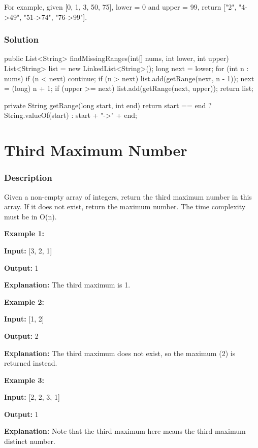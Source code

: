 For example, given [0, 1, 3, 50, 75], lower = 0 and upper = 99, return ["2", "4->49", "51->74", "76->99"].
\subsubsection{Solution}

\begin{Code}
public List<String> findMissingRanges(int[] nums, int lower, int upper) {
    List<String> list = new LinkedList<String>();
    long next = lower;
    for (int n : nums) {
        if (n < next) {
            continue;
        }
        if (n > next) {
            list.add(getRange(next, n - 1));
        }
        next = (long) n + 1;
    }
    if (upper >= next) {
        list.add(getRange(next, upper));
    }
    return list;
}

private String getRange(long start, int end) {
    return start == end ? String.valueOf(start) : start + "->" + end;
}
\end{Code}

\newpage

\section{Third Maximum Number} %

\subsubsection{Description}
Given a non-empty array of integers, return the third maximum number in this array. If it does not exist, return the maximum number. The time complexity must be in O(n).

\textbf{Example 1:}

\textbf{Input:} [3, 2, 1]

\textbf{Output:} 1

\textbf{Explanation:} The third maximum is 1.

\textbf{Example 2:}

\textbf{Input:} [1, 2]

\textbf{Output:} 2

\textbf{Explanation:} The third maximum does not exist, so the maximum (2) is returned instead.

\textbf{Example 3:}

\textbf{Input:} [2, 2, 3, 1]

\textbf{Output:} 1

\textbf{Explanation:} Note that the third maximum here means the third maximum distinct number.

